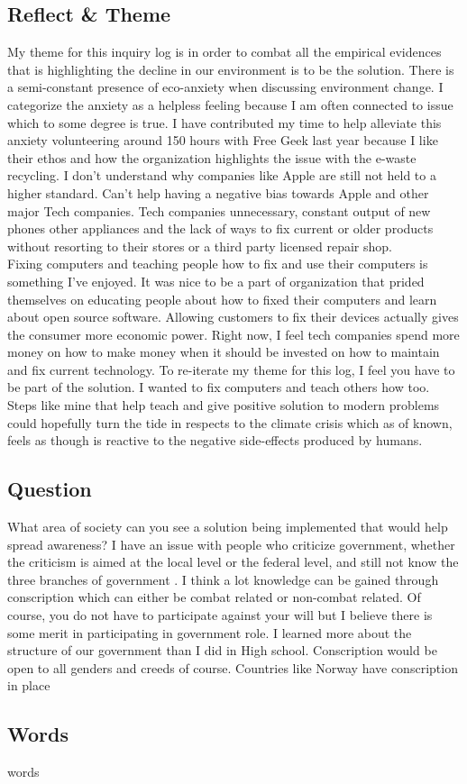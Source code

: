 \documentclass[a4paper,man,biblatex]{apa6}
\begin{document}
\subsection{Reflect \& Theme} My theme for this inquiry log is in order to combat all the empirical evidences that is highlighting the decline in our environment is to be the solution. There is a semi-constant presence of eco-anxiety when discussing environment change. I categorize the anxiety as a helpless feeling because I am often connected to issue which to some degree is true. I have contributed my time to help alleviate this anxiety volunteering around 150 hours with Free Geek last year because I like their ethos and how the organization highlights the issue with the e-waste recycling. I don't understand why companies like Apple are still not held to a higher standard. Can't help having a negative bias towards Apple  and other major Tech companies. Tech companies unnecessary, constant output of new phones other appliances and the lack of ways to fix current or older products without resorting to their stores or a third party licensed repair shop.\\Fixing computers and teaching people how to fix and use their computers is something I've enjoyed. It was nice to be a part of organization that prided themselves on educating people about how to fixed their computers and learn about open source software. Allowing customers to fix their devices actually gives the consumer more economic power. Right now, I feel tech companies spend more money on how to make money when it should be invested on how to maintain and fix current technology. To re-iterate my theme for this log, I feel you have to be part of the solution. I wanted to fix computers and teach others how too. Steps like mine that help teach and give positive solution to modern problems could hopefully turn the tide in respects to the climate crisis which as of known, feels as though is reactive to the negative side-effects produced by humans.   

\subsection{Question}  What area of society can you see a solution being implemented that would help spread awareness? I have an issue with people who criticize government, whether the criticism is aimed at the local level or the federal level, and still not know the three branches of government \autocite{branchessurvey}. I think a lot knowledge can be gained through conscription which can either be combat related or non-combat related. Of course, you do not have to participate against your will but I believe there is some merit in participating in government role. I learned more about the structure of our government than I did in High school. Conscription would be open to all genders and creeds of course. Countries like Norway have conscription in place \autocite{norwayconscript}

\subsection{Words}  words

\printbibliography
\end{document}
